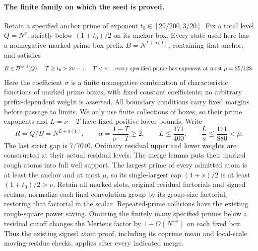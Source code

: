 \paragraph{The finite family on which the seed is proved.}
Retain a specified anchor prime of exponent
$t_0\in[29/200,3/20]$.  Fix a total level
$Q=N^\nu$, strictly below $(1+t_0)/2$ on its anchor box.
Every state used here has a nonnegative marked prime-box prefix
$B=N^{T+o(1)}$, containing that anchor, and satisfies
\begin{equation}\label{eq:second-seed-family}
 B\in\mathcal D^{\rm well}(Q),\quad
 T\ge t_0>2\nu-1,\quad T<\nu,\quad
 \text{every specified prime has exponent at most }\mu=25/128.
\end{equation}
Here the coefficient $\sigma$ is a finite nonnegative combination of
characteristic functions of marked prime boxes, with fixed constant
coefficients; no arbitrary prefix-dependent weight is asserted.
All boundary conditions carry fixed margins before passage to limits.
We only use finite collections of boxes, so their prime exponents
and $L=\nu-T$ have fixed positive lower bounds.  Write
\[
 R=Q/B=N^{L+o(1)},\qquad
 \alpha=\frac{1-T}{\nu-T}\ge2,\qquad
 L\le\frac{171}{400},\qquad
 \frac{L}{s}\le\frac{171}{880}<\mu.
\]
The last strict gap is $7/7040$.
Ordinary residual upper and lower weights are constructed at their
actual residual levels.  The merge lemma puts their marked rough
atoms into full well support.  The largest prime of every admitted
atom is at least the anchor and at most $\mu$, so its single-largest
cap $(1+x)/2$ is at least $(1+t_0)/2>\nu$.
Retain all marked slots, original residual factorials and signed
scalars; normalize each final convolution group by its group-size
factorial, restoring that factorial in the scalar.  Repeated-prime
collisions have the existing rough-square power saving.  Omitting
the finitely many specified primes below a residual cutoff changes
the Mertens factor by $1+O(N^{-\epsilon})$ on each fixed box.
Thus the existing signed atom proof, including its coprime mean and
local-scale moving-residue checks, applies after every indicated merge.

